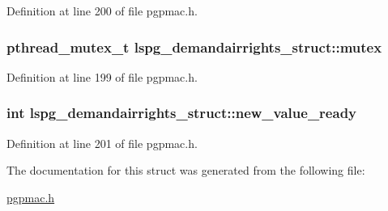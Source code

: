 Definition at line 200 of file pgpmac.\-h.

\hypertarget{structlspg__demandairrights__struct_a874970af767d4bb329f9764075b30096}{
\subsubsection[{mutex}]{\setlength{\rightskip}{0pt plus 5cm}pthread\-\_\-mutex\-\_\-t lspg\-\_\-demandairrights\-\_\-struct\-::mutex}}\label{structlspg__demandairrights__struct_a874970af767d4bb329f9764075b30096}


Definition at line 199 of file pgpmac.\-h.

\hypertarget{structlspg__demandairrights__struct_ad686c9a04d0c7e10b236c234eaf03ce7}{
\subsubsection[{new\-\_\-value\-\_\-ready}]{\setlength{\rightskip}{0pt plus 5cm}int lspg\-\_\-demandairrights\-\_\-struct\-::new\-\_\-value\-\_\-ready}}\label{structlspg__demandairrights__struct_ad686c9a04d0c7e10b236c234eaf03ce7}


Definition at line 201 of file pgpmac.\-h.



The documentation for this struct was generated from the following file\-:\begin{DoxyCompactItemize}
\item 
\hyperlink{pgpmac_8h}{pgpmac.\-h}\end{DoxyCompactItemize}
